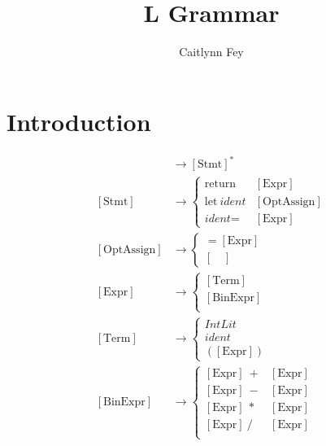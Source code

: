 \documentclass{article}
\title{L Grammar}
\author{Caitlynn Fey}
\begin{document}
	\maketitle
	\section{Introduction}
	\begin{align*} 
		[\text{Prog}] &\to  [\text{Stmt}]^* \\ 
		[\text{Stmt}] &\to  
		\begin{cases}
			\text{return} \ &[\text{Expr}] \\
			\text{let} \ \textit{ident} &[\text{OptAssign}] \\
			\textit{ident} = &[\text{Expr}]
		\end{cases} \\
		[\text{OptAssign}] &\to
		\begin{cases}
			= [\text{Expr}]\\
			[\quad]
		\end{cases} \\
		[\text{Expr}]	&\to 
		\begin{cases}
			[\text{Term}] \\
			[\text{BinExpr}] \\
		\end{cases} \\	
		[\text{Term}]	&\to 
		\begin{cases}
			\textit{IntLit} \\
			\textit{ident} \\
			([\text{Expr}])
		\end{cases} \\	
		[\text{BinExpr}]	&\to 
		\begin{cases}
			[\text{Expr}]\ + &[\text{Expr}] \\
			[\text{Expr}]\ - &[\text{Expr}] \\
			[\text{Expr}]\ * &[\text{Expr}] \\
			[\text{Expr}]\ / &[\text{Expr}] \\
		\end{cases}
	\end{align*}
\end{document}
